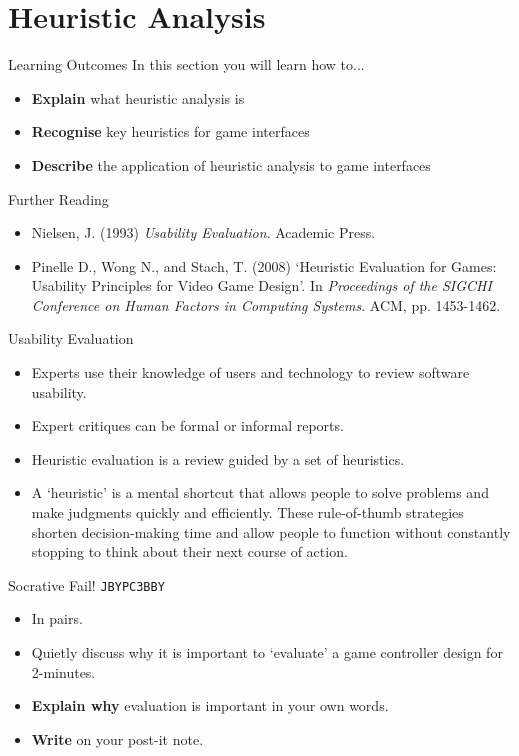 \part{Heuristic Analysis}
\frame{\partpage}

\begin{frame}{Learning Outcomes}
	In this section you will learn how to...
	
	\begin{itemize}
		\item \textbf{Explain} what heuristic analysis is
		\item \textbf{Recognise} key heuristics for game interfaces
		\item \textbf{Describe} the application of heuristic analysis to game interfaces
	\end{itemize}
\end{frame}

\begin{frame}{Further Reading}
	\begin{itemize}
		\item Nielsen, J. (1993) \textit{Usability Evaluation}. Academic Press.
		\item Pinelle D., Wong N., and Stach, T. (2008) `Heuristic Evaluation for Games: Usability Principles for Video Game Design'. In \textit{Proceedings of the SIGCHI Conference on Human Factors in Computing Systems}. ACM, pp. 1453-1462. 
	\end{itemize}
\end{frame}

\begin{frame}{Usability Evaluation}
	\begin{itemize}
		\item Experts use their knowledge of users and technology to review software usability.
		\item Expert critiques can be formal or informal reports.
		\item Heuristic evaluation is a review guided by a set of heuristics.
		\item A `heuristic' is a mental shortcut that allows people to solve problems and make judgments quickly 
		and efficiently. These rule-of-thumb strategies shorten decision-making time and allow people to function 
		without constantly stopping to think about their next course of action.
	\end{itemize}
\end{frame}

\begin{frame}[fragile]{Socrative Fail! \texttt{JBYPC3BBY}}
	\begin{itemize}
		\item In pairs.
		\item Quietly discuss why it is important to `evaluate' a game controller design for 2-minutes.
		\item \textbf{Explain why} evaluation is important in your own words.
		\item \textbf{Write} on your post-it note.
	\end{itemize}
\end{frame}



